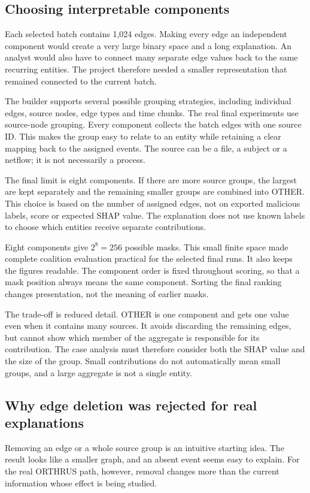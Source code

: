\documentclass[11pt,a4paper]{article}
\begin{document}
\subsection{Choosing interpretable components}
Each selected batch contains 1,024 edges. Making every edge an independent
component would create a very large binary space and a long explanation.
An analyst would also have to connect many separate edge values back to the
same recurring entities. The project therefore needed a smaller representation
that remained connected to the current batch.

The builder supports several possible grouping strategies, including individual
edges, source nodes, edge types and time chunks. The real final experiments use
source-node grouping. Every component collects the batch edges with one source
ID. This makes the group easy to relate to an entity while retaining a clear
mapping back to the assigned events. The source can be a file, a subject or a
netflow; it is not necessarily a process.

The final limit is eight components. If there are more source groups, the
largest are kept separately and the remaining smaller groups are combined into
OTHER. This choice is based on the number of assigned edges, not on exported
malicious labels, score or expected SHAP value. The explanation does not use
known labels to choose which entities receive separate contributions.

Eight components give $2^8=256$ possible masks. This small finite space made
complete coalition evaluation practical for the selected final runs. It also
keeps the figures readable. The component order is fixed throughout scoring,
so that a mask position always means the same component. Sorting the final
ranking changes presentation, not the meaning of earlier masks.

The trade-off is reduced detail. OTHER is one component and gets one value even
when it contains many sources. It avoids discarding the remaining edges, but
cannot show which member of the aggregate is responsible for its contribution.
The case analysis must therefore consider both the SHAP value and the size of
the group. Small contributions do not automatically mean small groups, and a
large aggregate is not a single entity.

\subsection{Why edge deletion was rejected for real explanations}
Removing an edge or a whole source group is an intuitive starting idea. The
result looks like a smaller graph, and an absent event seems easy to explain.
For the real ORTHRUS path, however, removal changes more than the current
information whose effect is being studied.
\end{document}
